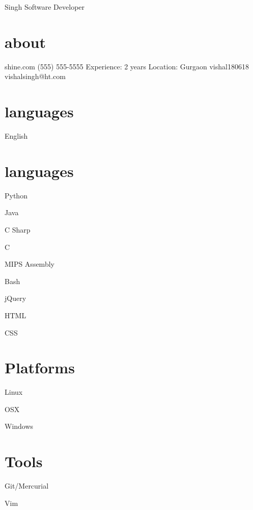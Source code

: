 \documentclass[]{friggeri-cv}
\begin{document}
 { Singh }
       { Software Developer }


\begin{aside}
  \section{about}
    shine.com
    (555) 555-5555
    Experience: 2 years
    Location: Gurgaon
    vishal180618
    vishalsingh@ht.com
    \section{languages}
    
    English
    


  
        \section{ languages }
            
                Python
            
                Java
            
                C Sharp
            
                C
            
                MIPS Assembly
            
                Bash
            
                jQuery
            
                HTML
            
                CSS
            
    
        \section{ Platforms }
            
                Linux
            
                OSX
            
                 Windows
            
    
        \section{ Tools }
            
                Git/Mercurial
            
                Vim
            

\end{aside}
\end{document}
